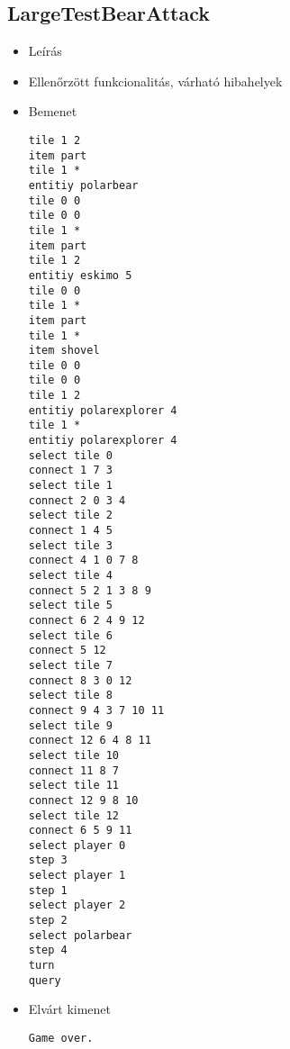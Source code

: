 \subsection{LargeTestBearAttack}
\begin{itemize}
\item Leírás\newline
\item Ellenőrzött funkcionalitás, várható hibahelyek
\item Bemenet
\begin{lstlisting}
tile 1 2
item part
tile 1 *
entitiy polarbear
tile 0 0
tile 0 0
tile 1 *
item part
tile 1 2
entitiy eskimo 5
tile 0 0
tile 1 *
item part
tile 1 *
item shovel
tile 0 0
tile 0 0
tile 1 2
entitiy polarexplorer 4
tile 1 *
entitiy polarexplorer 4
select tile 0
connect 1 7 3
select tile 1
connect 2 0 3 4
select tile 2
connect 1 4 5
select tile 3
connect 4 1 0 7 8
select tile 4
connect 5 2 1 3 8 9
select tile 5
connect 6 2 4 9 12
select tile 6
connect 5 12
select tile 7
connect 8 3 0 12
select tile 8
connect 9 4 3 7 10 11
select tile 9
connect 12 6 4 8 11
select tile 10
connect 11 8 7
select tile 11
connect 12 9 8 10
select tile 12
connect 6 5 9 11
select player 0
step 3
select player 1
step 1
select player 2
step 2
select polarbear
step 4
turn
query
\end{lstlisting}
\item Elvárt kimenet
\begin{lstlisting}
Game over.
\end{lstlisting}
\end{itemize}

